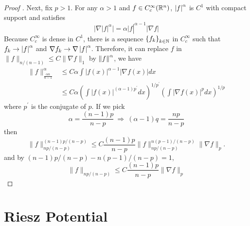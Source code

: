 \begin{proof}[Proof ]
	\noindent Next, fix $p > 1$. For any $\alpha > 1$ and $f \in C_c^\infty(\mathbb{R}^n)$, $\left\lvert f\right\lvert^\alpha$ is $C^1$ with compact support and satisfies
	\begin{equation*}
		\left.\left.|\nabla| f\right|^\alpha|=\alpha| f\right|^{\alpha-1}|\nabla f|
	\end{equation*}
	Because $C_c^\infty$ is dense in $C^1$, there is a sequence $\left\{f_k\right\}_{k \in \mathbb{N}}$ in $C_c^\infty$ such that $f_k \rightarrow \left\lvert f\right\lvert^\alpha$ and $\nabla f_k \rightarrow \nabla \left\lvert f\right\lvert^\alpha$. Therefore, it can replace $f$ in $\|f\|_{n /(n-1)} \leq C\|\nabla f\|_{1}$ by $\left\lVert f\right\lVert^\alpha$, we have
	\begin{equation*}
		\begin{aligned}
			\|f\|_{\frac{\alpha n}{n-1}}^\alpha & \leq C \alpha \int|f(x)|^{\alpha-1}|\nabla f(x)| d x \\
			& \leq C \alpha\left(\int|f(x)|^{(\alpha-1) p^{\prime}} d x\right)^{1 / p^{\prime}}\left(\int|\nabla f(x)|^p d x\right)^{1 / p}
		\end{aligned}
	\end{equation*}
	where $p^\prime$ is the conjugate of $p$. If we pick
	\begin{equation*}
		\alpha = \frac{(n-1)p}{n-p}~\Rightarrow~ (\alpha-1)q = \frac{np}{n-p}
	\end{equation*}
	then
	\begin{equation*}
		\|f\|_{n p /(n-p)}^{(n-1) p /(n-p)} \leq C \frac{(n-1) p}{n-p}\|f\|_{n p /(n-p)}^{n(p-1) /(n-p)}\|\nabla f\|_p .
	\end{equation*}
	and by $(n-1) p /(n-p)-n(p-1) /(n-p)=1$,
	\begin{equation*}
		\|f\|_{n p /(n-p)} \leq C \frac{(n-1) p}{n-p}\|\nabla f\|_p
	\end{equation*}
\end{proof}

\section{Riesz Potential}

